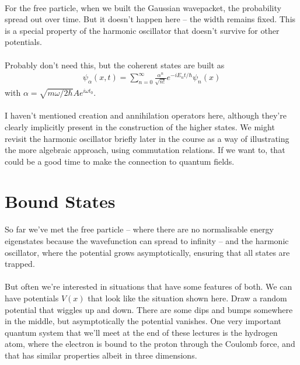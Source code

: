 \documentclass[12pt]{article}
\def\be{\begin{eqnarray}}
\def\ee{\end{eqnarray}}
\newcommand{\nn}{\nonumber}
\newcommand\para{\paragraph{}}
\newcommand{\cblue}{\color{blue}}
\begin{document}
\para
For the free particle, when we built the Gaussian wavepacket, the probability spread out over time. But it doesn't happen here -- the width remains fixed. This is a special property of the harmonic oscillator that doesn't survive for other potentials. 

\para
{\cblue Probably don't need this, but the coherent states are built as
%
\be \psi_{\alpha} (x,t) = \sum_{n=0}^\infty \frac{\alpha^n}{\sqrt{n!}} e^{-iE_nt/\hbar}\psi_n(x)\nn\ee
%
with $\alpha = \sqrt{m\omega/2\hbar} A e^{i\omega t_0}$.}


\para
{\cblue I haven't mentioned creation and annihilation operators here, although they're clearly implicitly present in the construction of the higher states. We might revisit the harmonic oscillator briefly later in the course as a way of illustrating the more algebraic approach, using commutation relations. If we want to, that could be a good time to make the connection to quantum fields.}


\newpage
\section{Bound States}

So far we've met the free particle -- where there are no normalisable energy eigenstates because the wavefunction can spread to infinity -- and the harmonic oscillator, where the potential grows asymptotically, ensuring that all states are trapped. 

\para
But often we're interested in situations that have some features of both. We can have potentials $V(x)$ that look like the situation shown here. {\cblue Draw a random potential that wiggles up and down}. There are some dips and bumps somewhere in the middle, but asymptotically the potential vanishes. One very important quantum system that we'll meet at the end of these lectures is the hydrogen atom, where the electron is bound to the proton through the Coulomb force, and that has similar properties albeit in three dimensions.
\end{document}
